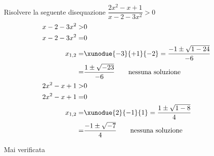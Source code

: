 		Risolvere la seguente disequazione $\dfrac{2x^2-x+1}{x-2-3x^2}> 0$
	\begin{align*}
	x-2-3x^2>&0\\
	x-2-3x^2=&0\\
	x_{1,2}=&\xunodue{-3}{+1}{-2}=\dfrac{-1\pm\sqrt{1-24}}{-6}\\
	=&\dfrac{1\pm\sqrt{-23}}{-6}
	\qquad\text{nessuna soluzione}\\
	2x^2-x+1>&0\\
	2x^2-x+1=&0\\
	x_{1,2}=&\xunodue{2}{-1}{1}=\dfrac{1\pm\sqrt{1-8}}{4}\\
	=&\dfrac{-1\pm\sqrt{-7}}{4}
	\qquad\text{nessuna soluzione}\\
	\end{align*}
	\begin{center}
		
	\end{center}
Mai verificata
